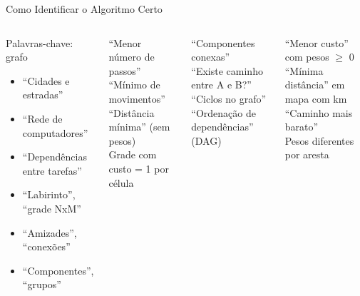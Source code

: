 \documentclass[aspectratio=169,10pt]{beamer}
\begin{document}
\begin{frame}{Como Identificar o Algoritmo Certo}
  \begin{columns}[t]
      \begin{block}{Palavras-chave: grafo}
        \begin{itemize}\footnotesize
          \item ``Cidades e estradas''
          \item ``Rede de computadores''
          \item ``Dependências entre tarefas''
          \item ``Labirinto'', ``grade NxM''
          \item ``Amizades'', ``conexões''
          \item ``Componentes'', ``grupos''
        \end{itemize}
      \end{block}
      \vspace{0.1cm}
      \begin{tcolorbox}[caixaLaranja,title={Sinais de BFS}]
        \footnotesize
        ``Menor número de passos''\\
        ``Mínimo de movimentos''\\
        ``Distância mínima'' (sem pesos)\\
        Grade com custo = 1 por célula
      \end{tcolorbox}
      \vspace{0.1cm}
      \begin{tcolorbox}[caixaDfs,title={Sinais de DFS}]
        \footnotesize
        ``Componentes conexas''\\
        ``Existe caminho entre A e B?''\\
        ``Ciclos no grafo''\\
        ``Ordenação de dependências'' (DAG)
      \end{tcolorbox}
      \begin{tcolorbox}[caixaRoxa,title={Sinais de Dijkstra}]
        \footnotesize
        ``Menor custo'' com pesos $\ge$ 0\\
        ``Mínima distância'' em mapa com km\\
        ``Caminho mais barato''\\
        Pesos diferentes por aresta
      \end{tcolorbox}

\end{columns}
\end{frame}
\end{document}
